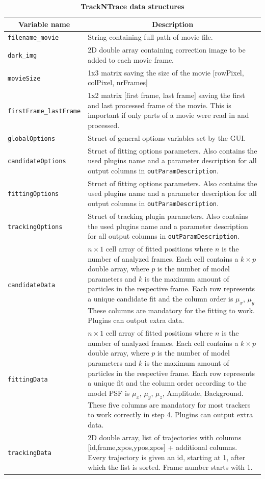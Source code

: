 \documentclass[11pt,onside]{report}
\numberwithin{equation}{chapter}
\begin{document}
\begin{table}[!h]
\centering
\caption*{\textbf{TrackNTrace data structures}}
\label{tab:datastruct}
\begin{tabular}{p{} p{}}
\toprule
\multicolumn{1}{c}{Variable name} & \multicolumn{1}{c}{Description}\\ \midrule
\texttt{filename\_movie} & String containing full path of movie file. \\[5pt]
\texttt{dark\_img} & 2D double array containing correction image to be added to each movie frame. \\[5pt]
\texttt{movieSize} & 1x3 matrix saving the size of the movie [rowPixel, colPixel, nrFrames] \\[5pt]
\texttt{firstFrame\_lastFrame} & 1x2 matrix [first frame, last frame] saving the first and last processed frame of the movie. This is important if only parts of a movie were read in and processed. \\[5pt]
\texttt{globalOptions} & Struct of general options variables set by the GUI. \\[5pt]
\texttt{candidateOptions} & Struct of fitting options parameters. Also contains the used plugins name and a parameter description for all output columns in \texttt{outParamDescription}. \\[5pt]
\texttt{fittingOptions} & Struct of fitting options parameters. Also contains the used plugins name and a parameter description for all output columns in \texttt{outParamDescription}. \\[5pt]
\texttt{trackingOptions} & Struct of tracking plugin parameters. Also contains the used plugins name and a parameter description for all output columns in \texttt{outParamDescription}. \\[5pt]
\texttt{candidateData} & $n\times 1$ cell array of fitted positions where $n$ is the number of analyzed frames. Each cell contains a $k\times p$ double array, where $p$ is the number of model parameters and $k$ is the maximum amount of particles in the respective frame. Each row represents a unique candidate fit and the column order is $\mu_x$, $\mu_y$These columns are mandatory for the fitting to work. Plugins can output extra data.\\
\texttt{fittingData} & $n\times 1$ cell array of fitted positions where $n$ is the number of analyzed frames. Each cell contains a $k\times p$ double array, where $p$ is the number of model parameters and $k$ is the maximum amount of particles in the respective frame. Each row represents a unique fit and the column order according to the model PSF is $\mu_x$, $\mu_y$, $\mu_z$, Amplitude, Background. These five columns are mandatory for most trackers to work correctly in step 4. Plugins can output extra data.\\
\texttt{trackingData} & 2D double array, list of trajectories with columns  [id,frame,xpos,ypos,zpos] + additional columns. Every trajectory is given an id, starting at 1, after which the list is sorted. Frame number starts with 1.\\
\bottomrule
\end{tabular}
\end{table}
\end{document}
